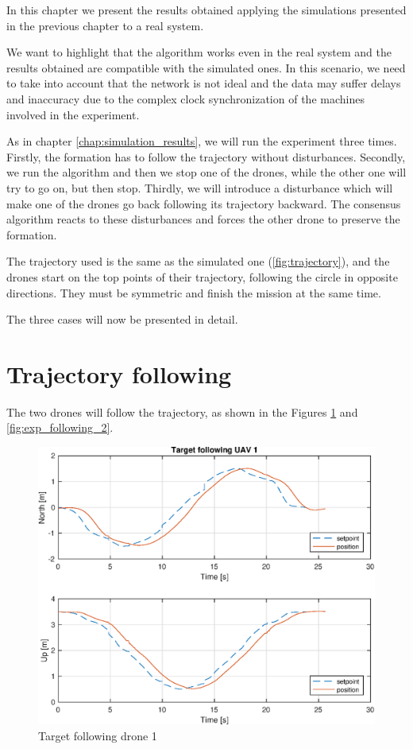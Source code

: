In this chapter we present the results obtained applying the simulations presented in the
previous chapter to a real system.

We want to highlight that the algorithm works even in the real system
and the results obtained are compatible with the simulated ones.
In this scenario, we need to take into account that the network is not ideal and
the data may suffer delays and inaccuracy due to the complex clock synchronization
of the machines involved in the experiment.

As in chapter \ref{chap:simulation_results}, we will run the experiment three times.
Firstly, the formation has to follow the trajectory without disturbances.
Secondly, we run the algorithm and then we stop one of the drones, while the other one
will try to go on, but then stop.
Thirdly, we will introduce a disturbance which will make one of the drones
go back following its trajectory backward.
The consensus algorithm reacts to these disturbances and forces the other
drone to preserve the formation.

The trajectory used is the same as the simulated one (\ref{fig:trajectory}), and
the drones start on the top points of their trajectory, following the circle in opposite
directions.
They must be symmetric and finish the mission at the same time.

The three cases will now be presented in detail.

\section{Trajectory following}
The two drones will follow the trajectory, as shown in the Figures \ref{fig:exp_following_1}
and \ref{fig:exp_following_2}.

\begin{figure}
\centering
\includegraphics[width=0.7\linewidth]{chapters/chapter-05/figures/following_1.eps}
\caption{Target following drone 1}
\label{fig:exp_following_1}
\end{figure}

